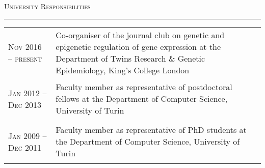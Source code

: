 \documentclass[a4paper,10pt]{article}
\newcommand{\mediumtitle}[1]{
	\vspace{0.2cm}
	{\noindent
	\Large \textsc{#1}\\[-2ex]
	\hrule
	\vspace{0.2cm}}
}
\newenvironment{doubletablelist}
{
	\vspace{-0.2cm}
	\begin{longtable}[!h]{AB}}{\end{longtable}
}
\newcommand{\dtlist}[2]{
\hspace{-3cm}
\noindent
	\begin{minipage}{0.22\textwidth}
	\begin{flushright}
	\textsc{#1}
	\end{flushright}
	\end{minipage}
	& #2\\[0.2cm]
}
\newcommand{\minusitem}{\item[-]}
\begin{document}
\newpage


%


\mediumtitle{University Responsibilities}

\begin{doubletablelist}

	\dtlist{Nov 2016 -- present}{Co-organiser of the journal club on genetic and epigenetic regulation of gene expression at the Department of Twins Research \& Genetic Epidemiology, King's College London}
	\dtlist{Jan 2012 -- Dec 2013}{Faculty member as representative of postdoctoral fellows at the Department of Computer Science, University of Turin}
	\dtlist{Jan 2009 -- Dec 2011}{Faculty member as representative of PhD students at the Department of Computer Science, University of Turin}
	
\end{doubletablelist}
\end{document}
